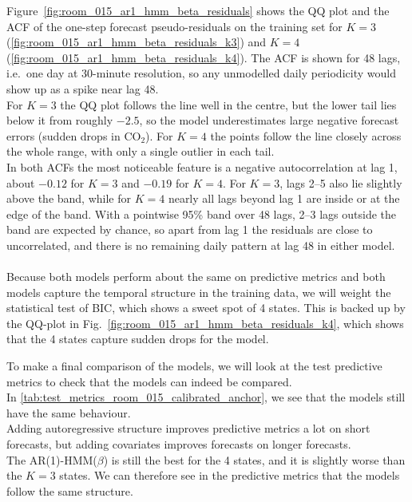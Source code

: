 
Figure~\ref{fig:room_015_ar1_hmm_beta_residuals} shows the QQ plot and the ACF of the one-step forecast
pseudo-residuals on the training set for $K=3$ (\ref{fig:room_015_ar1_hmm_beta_residuals_k3}) and
$K=4$ (\ref{fig:room_015_ar1_hmm_beta_residuals_k4}). The ACF is shown for 48 lags, i.e.\ one day at
30-minute resolution, so any unmodelled daily periodicity would show up as a spike near lag 48. \\
For $K=3$ the QQ plot follows the line well in the centre, but the lower tail lies below it from
roughly $-2.5$, so the model underestimates large negative forecast errors (sudden drops in $\text{CO}_2$).
For $K=4$ the points follow the line closely across the whole range, with only a single outlier in each tail. \\
In both ACFs the most noticeable feature is a negative autocorrelation at lag 1, about $-0.12$ for $K=3$ and
$-0.19$ for $K=4$. For $K=3$, lags 2--5 also lie slightly above the band, while for $K=4$ nearly all lags
beyond lag 1 are inside or at the edge of the band. With a pointwise 95\% band over 48 lags, 2--3 lags
outside the band are expected by chance, so apart from lag 1 the residuals are close to uncorrelated,
and there is no remaining daily pattern at lag 48 in either model.\\
\\
Because both models perform about the same on predictive metrics and both models capture the temporal structure
in the training data, we will weight the statistical test of BIC, which shows a sweet spot of 4 states. This is backed up by the
QQ-plot in Fig.~\ref{fig:room_015_ar1_hmm_beta_residuals_k4}, which shows that the 4 states capture sudden drops for the model.
\bigskip

To make a final comparison of the models, we will look at the test predictive metrics to check that the
models can indeed be compared. \\

In \cref{tab:test_metrics_room_015_calibrated_anchor}, we see that the models still have the same behaviour. \\
Adding autoregressive structure improves predictive metrics a lot on short forecasts, but adding covariates improves forecasts on longer forecasts. \\
The AR(1)-HMM($\beta$) is still the best for the 4 states, and it is slightly worse than the $K=3$ states. We can therefore see in the predictive metrics
that the models follow the same structure.

